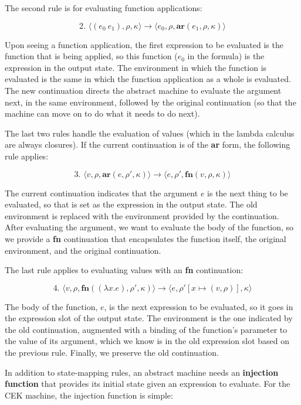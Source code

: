 \documentclass{article}
\begin{document}
The second rule is for evaluating function applications:

$$ \text{2. } \langle (e_0\ e_1), \rho, \kappa \rangle \to \langle e_0, \rho, \textbf{ar}(e_1, \rho, \kappa) \rangle $$

Upon seeing a function application, the first expression to be evaluated is the function that is being applied, so this function ($e_0$ in the formula) is the expression in the output state. The environment in which the function is evaluated is the same in which the function application as a whole is evaluated. The new continuation directs the abstract machine to evaluate the argument next, in the same environment, followed by the original continuation (so that the machine can move on to do what it needs to do next).

The last two rules handle the evaluation of values (which in the lambda calculus are always closures). If the current continuation is of the \textbf{ar} form, the following rule applies:

$$ \text{3. } \langle v, \rho, \textbf{ar}(e, \rho', \kappa) \rangle \to \langle e, \rho', \textbf{fn}(v, \rho, \kappa) \rangle $$

The current continuation indicates that the argument $e$ is the next thing to be evaluated, so that is set as the expression in the output state. The old environment is replaced with the environment provided by the continuation. After evaluating the argument, we want to evaluate the body of the function, so we provide a \textbf{fn} continuation that encapsulates the function itself, the original environment, and the original continuation.

The last rule applies to evaluating values with an \textbf{fn} continuation:

$$ \text{4. } \langle v, \rho, \textbf{fn}((\lambda x.e), \rho', \kappa) \rangle \to \langle e, \rho'[x \mapsto (v, \rho)], \kappa \rangle $$

The body of the function, $e$, is the next expression to be evaluated, so it goes in the expression slot of the output state. The environment is the one indicated by the old continuation, augmented with a binding of the function's parameter to the value of its argument, which we know is in the old expression slot based on the previous rule. Finally, we preserve the old continuation.

In addition to state-mapping rules, an abstract machine needs an \textbf{injection function} that provides its initial state given an expression to evaluate. For the CEK machine, the injection function is simple:
\end{document}
